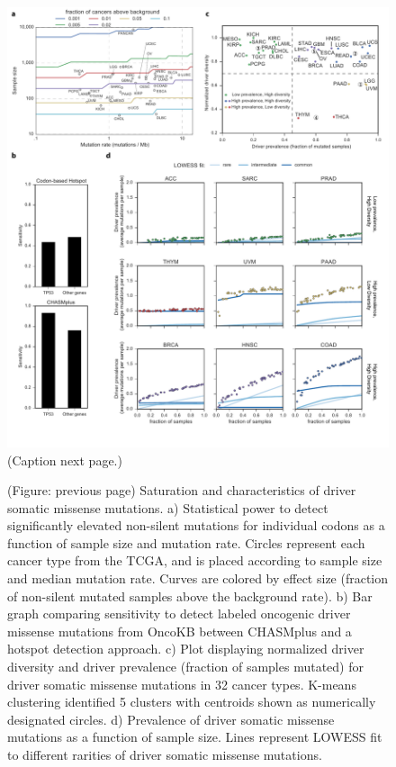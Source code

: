 \begin{figure}[b!]
  \centering
  \makeatletter
  \let\@currsize\normalsize
  \includegraphics[width=\linewidth]{figures/chapter6/diversity_and_saturation.pdf}
  \caption[Saturation and characteristics of driver somatic missense mutations.]{(Caption next page.)}
  \label{fig:chasmplus_power}
\end{figure}
\addtocounter{figure}{-1}
\begin{figure} [t!]
  \caption[(continued) Saturation and characteristics of driver somatic missense mutations.]{(Figure: previous page) Saturation and characteristics of driver somatic missense mutations. a) Statistical power to detect significantly elevated non-silent mutations for individual codons as a function of sample size and mutation rate. Circles represent each cancer type from the TCGA, and is placed according to sample size and median mutation rate. Curves are colored by effect size (fraction of non-silent mutated samples above the background rate). b) Bar graph comparing sensitivity to detect labeled oncogenic driver missense mutations from OncoKB between CHASMplus and a hotspot detection approach. c) Plot displaying normalized driver diversity and driver prevalence (fraction of samples mutated) for driver somatic missense mutations in 32 cancer types. K-means clustering identified 5 clusters with centroids shown as numerically designated circles. d) Prevalence of driver somatic missense mutations as a function of sample size. Lines represent LOWESS fit to different rarities of driver somatic missense mutations.}
\end{figure}


